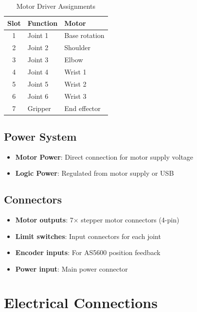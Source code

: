 \documentclass[12pt,a4paper]{report}
\begin{document}
\begin{table}[H]
    \centering
    \begin{tabular}{|c|l|l|}
        \hline
        \textbf{Slot} & \textbf{Function} & \textbf{Motor} \\
        \hline
        1 & Joint 1 & Base rotation \\
        2 & Joint 2 & Shoulder \\
        3 & Joint 3 & Elbow \\
        4 & Joint 4 & Wrist 1 \\
        5 & Joint 5 & Wrist 2 \\
        6 & Joint 6 & Wrist 3 \\
        7 & Gripper & End effector \\
        \hline
    \end{tabular}
    \caption{Motor Driver Assignments}
    \label{tab:driver_assignments}
\end{table}

\subsection{Power System}

\begin{itemize}
    \item \textbf{Motor Power}: Direct connection for motor supply voltage
    \item \textbf{Logic Power}: Regulated from motor supply or USB
\end{itemize}

\subsection{Connectors}

\begin{itemize}
    \item \textbf{Motor outputs}: 7× stepper motor connectors (4-pin)
    \item \textbf{Limit switches}: Input connectors for each joint
    \item \textbf{Encoder inputs}: For AS5600 position feedback
    \item \textbf{Power input}: Main power connector
\end{itemize}

\section{Electrical Connections}
\end{document}
